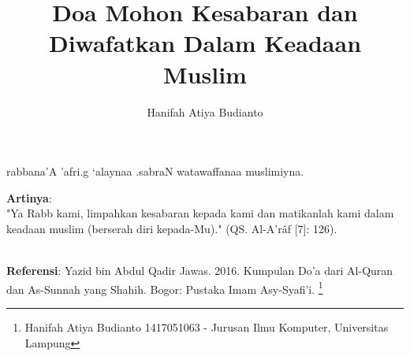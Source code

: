 \documentclass[a4paper,12pt]{article}
\title{\Large Doa Mohon Kesabaran dan Diwafatkan Dalam Keadaan Muslim}
\author{\calligra Hanifah Atiya Budianto}
\begin{document}
\sffamily
\maketitle 
\fullvocalize
{}
\begin{arabtext}
\noindent
rabbana'A 'afri.g `alaynaa .sabraN watawaffanaa muslimiyna.\\
\end{arabtext}
\noindent
\textbf{Artinya}:\\
\indent
"Ya Rabb kami, limpahkan kesabaran kepada kami dan matikanlah kami dalam 
keadaan muslim (berserah diri kepada-Mu)." (QS. Al-A'r\^{a}f [7]: 126).\\\\
\par
\noindent
\textbf{Referensi}: Yazid bin Abdul Qadir Jawas. 2016. Kumpulan Do'a dari
Al-Quran dan As-Sunnah yang Shahih. Bogor: Pustaka Imam Asy-Syafi'i.
\footnote{Hanifah Atiya Budianto 1417051063 - Jurusan Ilmu Komputer,
Universitas Lampung}
\end{document}
